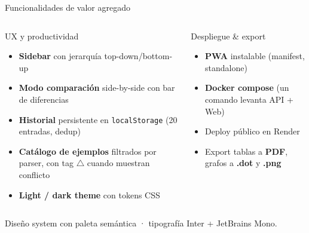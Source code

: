 \documentclass[aspectratio=169,10pt]{beamer}
\begin{document}
\begin{frame}{Funcionalidades de valor agregado}
  \begin{columns}[T,onlytextwidth]
    \begin{block}{UX y productividad}
      \begin{itemize}
        \item \textbf{Sidebar} con jerarquía top-down/bottom-up
        \item \textbf{Modo comparación} side-by-side con bar de diferencias
        \item \textbf{Historial} persistente en \texttt{localStorage} (20 entradas, dedup)
        \item \textbf{Catálogo de ejemplos} filtrados por parser, con tag $\triangle$ cuando muestran conflicto
        \item \textbf{Light / dark theme} con tokens CSS
      \end{itemize}
    \end{block}

    \begin{block}{Despliegue \& export}
      \begin{itemize}
        \item \textbf{PWA} instalable (manifest, standalone)
        \item \textbf{Docker compose} (un comando levanta API + Web)
        \item Deploy público en Render
        \item Export tablas a \textbf{PDF}, grafos a \textbf{.dot} y \textbf{.png}
      \end{itemize}
    \end{block}
  \end{columns}

  \vspace{4pt}
  \centering\footnotesize
  Diseño system con paleta semántica · tipografía Inter + JetBrains Mono.
\end{frame}
\end{document}
